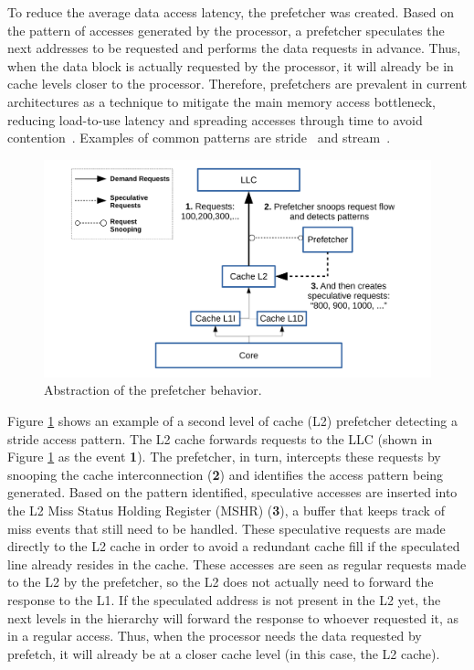 \documentclass[AMA,final,STIX1COL]{WileyNJD-v2}
\begin{document}
To reduce the average data access latency, the prefetcher was created.
Based on the pattern of accesses generated by the processor, a prefetcher speculates the next addresses to be requested and performs the data requests in advance.
Thus, when the data block is actually requested by the processor, it will already be in cache levels closer to the processor.
Therefore, prefetchers are prevalent in current architectures as a technique to mitigate the main memory access bottleneck, reducing load-to-use latency and spreading accesses through time to avoid contention~\cite{bakhshalipour2019bingo}.
Examples of common patterns are stride~\cite{chen1995effective} and stream~\cite{le2007ibm}.

\begin{figure}[!htb]
    \centering
        \includegraphics[width=.7\textwidth]{figures/figpref-en.pdf}
  \caption{Abstraction of the prefetcher behavior.}
  \label{fig:prefetcher}
\end{figure}

Figure \ref{fig:prefetcher} shows an example of a second level of cache (L2) prefetcher detecting a stride access pattern.
The L2 cache forwards requests to the LLC (shown in Figure \ref{fig:prefetcher} as the event \textbf{1}).
The prefetcher, in turn, intercepts these requests by snooping the cache interconnection (\textbf{2}) and identifies the access pattern being generated.
Based on the pattern identified, speculative accesses are inserted into the L2 Miss Status Holding Register (MSHR) (\textbf{3}), a buffer that keeps track of miss events that still need to be handled.
These speculative requests are made directly to the L2 cache in order to avoid a redundant cache fill if the speculated line already resides in the cache.
These accesses are seen as regular requests made to the L2 by the prefetcher, so the L2 does not actually need to forward the response to the L1.
If the speculated address is not present in the L2 yet, the next levels in the hierarchy will forward the response to whoever requested it, as in a regular access.
Thus, when the processor needs the data requested by prefetch, it will already be at a closer cache level (in this case, the L2 cache).
\end{document}

